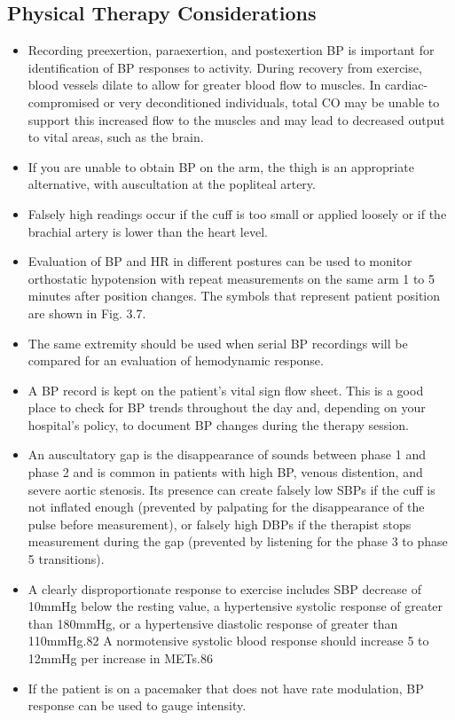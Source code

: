 \subsection{Physical Therapy Considerations}
\begin{itemize}
\item Recording preexertion, paraexertion, and postexertion BP is important for identification of BP responses to activity. During recovery from exercise, blood vessels dilate to allow for greater blood flow to muscles. In cardiac-compromised or very deconditioned individuals, total CO may be unable to support this increased flow to the muscles and may lead to decreased output to vital areas, such as the brain.
\item If you are unable to obtain BP on the arm, the thigh is an appropriate alternative, with auscultation at the popliteal artery.
\item Falsely high readings occur if the cuff is too small or applied loosely or if the brachial artery is lower than the heart level.
\item Evaluation of BP and HR in different postures can be used to monitor orthostatic hypotension with repeat measurements on the same arm 1 to 5 minutes after position changes. The symbols that represent patient position are shown in Fig. 3.7.
\item The same extremity should be used when serial BP recordings will be compared for an evaluation of hemodynamic response.
\item A BP record is kept on the patient’s vital sign flow sheet. This is a good place to check for BP trends throughout the day and, depending on your hospital’s policy, to document BP changes during the therapy session.
\item An auscultatory gap is the disappearance of sounds between phase 1 and phase 2 and is common in patients with high BP, venous distention, and severe aortic stenosis. Its presence can create falsely low SBPs if the cuff is not inflated enough (prevented by palpating for the disappearance of the pulse before measurement), or falsely high DBPs if the therapist stops measurement during the gap (prevented by listening for the phase 3 to phase 5 transitions).
\item A clearly disproportionate response to exercise includes SBP decrease of 10mmHg below the resting value, a hypertensive systolic response of greater than 180mmHg, or a hypertensive diastolic response of greater than 110mmHg.82 A normotensive systolic blood response should increase 5 to 12mmHg per increase in METs.86
\item If the patient is on a pacemaker that does not have rate modulation, BP response can be used to gauge intensity. 
\end{itemize}

\printbibliography[heading=subbibintoc]